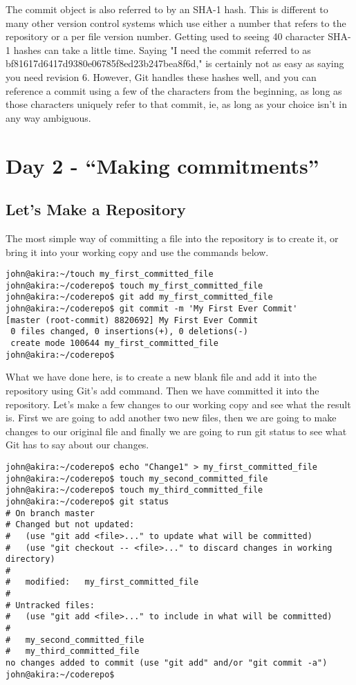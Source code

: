 The commit object is also referred to by an SHA-1 hash.  This is different to many other version control systems which use either a number that refers to the repository or a per file version number.  Getting used to seeing 40 character SHA-1 hashes can take a little time.  Saying "I need the commit referred to as  bf81617d6417d9380e06785f8ed23b247bea8f6d," is certainly not as easy as saying you need revision 6.  However, Git handles these hashes well, and you can reference a commit using a few of the characters from the beginning, as long as those characters uniquely refer to that commit, ie, as long as your choice isn't in any way ambiguous.

\section{Day 2 - ``Making commitments''}
\subsection{Let's Make a Repository}

The most simple way of committing a file into the repository is to create it, or bring it into your working copy and use the commands below.

\begin{Verbatim}[frame=single,fontsize=\relsize{-3}] 
john@akira:~/touch my_first_committed_file
john@akira:~/coderepo$ touch my_first_committed_file
john@akira:~/coderepo$ git add my_first_committed_file
john@akira:~/coderepo$ git commit -m 'My First Ever Commit'
[master (root-commit) 8820692] My First Ever Commit
 0 files changed, 0 insertions(+), 0 deletions(-)
 create mode 100644 my_first_committed_file
john@akira:~/coderepo$
\end{Verbatim} 

What we have done here, is to create a new blank file and add it into the repository using Git's add command.  Then we have committed it into the repository.  Let's make a few changes to our working copy and see what the result is.  First we are going to add another two new files, then we are going to make changes to our original file and finally we are going to run git status to see what Git has to say about our changes.

\begin{Verbatim}[frame=single,fontsize=\relsize{-3}] 
john@akira:~/coderepo$ echo "Change1" > my_first_committed_file 
john@akira:~/coderepo$ touch my_second_committed_file
john@akira:~/coderepo$ touch my_third_committed_file
john@akira:~/coderepo$ git status
# On branch master
# Changed but not updated:
#   (use "git add <file>..." to update what will be committed)
#   (use "git checkout -- <file>..." to discard changes in working directory)
#
#	modified:   my_first_committed_file
#
# Untracked files:
#   (use "git add <file>..." to include in what will be committed)
#
#	my_second_committed_file
#	my_third_committed_file
no changes added to commit (use "git add" and/or "git commit -a")
john@akira:~/coderepo$ 
\end{Verbatim} 

